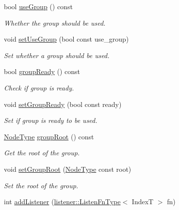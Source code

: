 \begin{DoxyCompactItemize}
bool \hyperlink{structvt_1_1vrt_1_1collection_1_1_holder_af9a9e5dbf89d84e9fb4d267f720bfa4e}{use\+Group} () const
\begin{DoxyCompactList}\small\item\em Whether the group should be used. \end{DoxyCompactList}\item 
void \hyperlink{structvt_1_1vrt_1_1collection_1_1_holder_aa76e02e027429572c1c9b2169d013e56}{set\+Use\+Group} (bool const use\+\_\+group)
\begin{DoxyCompactList}\small\item\em Set whether a group should be used. \end{DoxyCompactList}\item 
bool \hyperlink{structvt_1_1vrt_1_1collection_1_1_holder_afeafe4c77613531a166be80bdaea4fd6}{group\+Ready} () const
\begin{DoxyCompactList}\small\item\em Check if group is ready. \end{DoxyCompactList}\item 
void \hyperlink{structvt_1_1vrt_1_1collection_1_1_holder_aa666f9e2960605203d325fd39de82dd7}{set\+Group\+Ready} (bool const ready)
\begin{DoxyCompactList}\small\item\em Set if group is ready to be used. \end{DoxyCompactList}\item 
\hyperlink{namespacevt_a866da9d0efc19c0a1ce79e9e492f47e2}{Node\+Type} \hyperlink{structvt_1_1vrt_1_1collection_1_1_holder_a4712da9a79782e5c33de2773d66cc587}{group\+Root} () const
\begin{DoxyCompactList}\small\item\em Get the root of the group. \end{DoxyCompactList}\item 
void \hyperlink{structvt_1_1vrt_1_1collection_1_1_holder_a9805b84e57120bc7088058f782eb56f4}{set\+Group\+Root} (\hyperlink{namespacevt_a866da9d0efc19c0a1ce79e9e492f47e2}{Node\+Type} const root)
\begin{DoxyCompactList}\small\item\em Set the root of the group. \end{DoxyCompactList}\item 
int \hyperlink{structvt_1_1vrt_1_1collection_1_1_holder_a07ea68abde3582b2300a86b32c3ff3e8}{add\+Listener} (\hyperlink{namespacevt_1_1vrt_1_1collection_1_1listener_a62d04c44a3c187eae66bdba2090b4505}{listener\+::\+Listen\+Fn\+Type}$<$ IndexT $>$ fn)

\end{DoxyCompactItemize}
